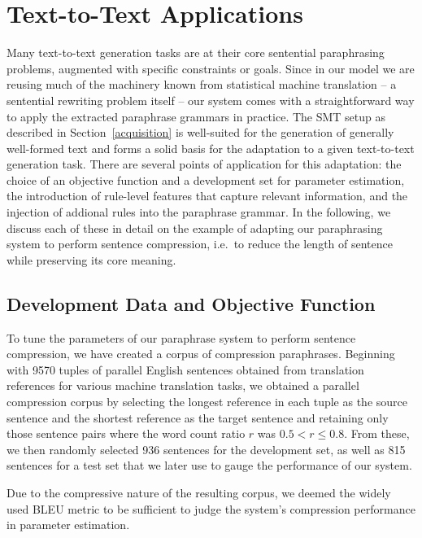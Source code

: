 \documentclass[11pt]{article}
\begin{document}
\section{Text-to-Text Applications} \label{adaptation}

Many text-to-text generation tasks are at their core sentential
paraphrasing problems, augmented with specific constraints or
goals. Since in our model we are reusing much of the machinery known
from statistical machine translation -- a sentential rewriting problem
itself -- our system comes with a straightforward way to apply the
extracted paraphrase grammars in practice. The SMT setup as described
in Section~\ref{acquisition} is well-suited for the generation of
generally well-formed text and forms a solid basis for the adaptation
to a given text-to-text generation task. There are several points of
application for this adaptation: the choice of an objective function
and a development set for parameter estimation, the introduction of
rule-level features that capture relevant information, and the
injection of addional rules into the paraphrase grammar. In the
following, we discuss each of these in detail on the example of
adapting our paraphrasing system to perform sentence compression,
i.e.\ to reduce the length of sentence while preserving its core
meaning.

\subsection{Development Data and Objective Function}
To tune the parameters of our paraphrase system to perform sentence
compression, we have created a corpus of compression
paraphrases. Beginning with 9570 tuples of parallel English sentences
obtained from translation references for various machine translation
tasks, we obtained a parallel compression corpus by selecting the
longest reference in each tuple as the source sentence and the
shortest reference as the target sentence and retaining only those
sentence pairs where the word count ratio $r$ was $0.5 < r \leq
0.8$. From these, we then randomly selected 936 sentences for the
development set, as well as 815 sentences for a test set that we later
use to gauge the performance of our system.

Due to the compressive nature of the resulting corpus, we deemed the
widely used BLEU metric \cite{Papineni2002} to be sufficient to judge
the system's compression performance in parameter estimation.
\end{document}
